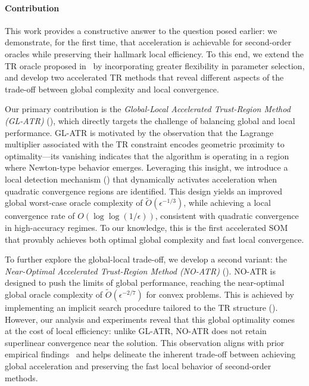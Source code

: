 \paragraph{Contribution}
This work provides a constructive answer to the question posed earlier: we demonstrate, for the first time, that acceleration is achievable for second-order oracles while preserving their hallmark local efficiency. To this end, we extend the TR oracle proposed in~\citet{jiang2024nonconvexityuniversaltrustregionmethod} by incorporating greater flexibility in parameter selection, and develop two accelerated TR methods that reveal different aspects of the trade-off between global complexity and local convergence.

Our primary contribution is the \emph{Global-Local Accelerated Trust-Region Method (GL-ATR)} (), which directly targets the challenge of balancing global and local performance. GL-ATR is motivated by the observation that the Lagrange multiplier associated with the TR constraint encodes geometric proximity to optimality—its vanishing indicates that the algorithm is operating in a region where Newton-type behavior emerges. Leveraging this insight, we introduce a local detection mechanism () that dynamically activates acceleration when quadratic convergence regions are identified. This design yields an improved global worst-case oracle complexity of $\tilde{O}(\epsilon^{-1/3})$, while achieving a local convergence rate of $O(\log\log(1/\epsilon))$, consistent with quadratic convergence in high-accuracy regimes. To our knowledge, this is the first accelerated SOM that provably achieves both optimal global complexity and fast local convergence.

To further explore the global-local trade-off, we develop a second variant: the \emph{Near-Optimal Accelerated Trust-Region Method (NO-ATR)} (). NO-ATR is designed to push the limits of global performance, reaching the near-optimal global oracle complexity of $\tilde{O}(\epsilon^{-2/7})$ for convex problems. This is achieved by implementing an implicit search procedure tailored to the TR structure (). However, our analysis and experiments reveal that this global optimality comes at the cost of local efficiency: unlike GL-ATR, NO-ATR does not retain superlinear convergence near the solution. This observation aligns with prior empirical findings~\cite{carmon2022optimal,huang2024inexact} and helps delineate the inherent trade-off between achieving global acceleration and preserving the fast local behavior of second-order methods.

